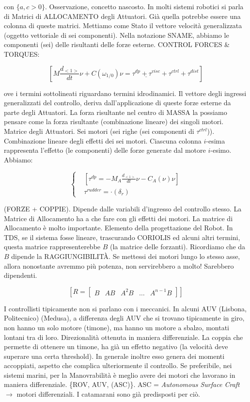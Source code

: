 con $\{a,c>0\}$. Osservazione, concetto nascosto. In molti sistemi robotici si parla di Matrici di ALLOCAMENTO degli Attuatori. Già quella potrebbe essere una colonna di queste matrici. Mettiamo come Stato il vettore velocità generalizzata (oggetto vettoriale di sei componenti). Nella notazione SNAME, abbiamo le componenti (sei) delle risultanti delle forze esterne. CONTROL FORCES \& TORQUES:

\[
	[M\frac{d_{<1>}}{dt}\nu + C(\omega_{1/0})\nu = \underline{\tau^{dp}+\tau^{visc}} + \tau^{ctrl}+\tau^{dist}]
\]

ove i termini sottolineati riguardano termini idrodinamici. Il vettore degli ingressi generalizzati del controllo, deriva dall'applicazione di queste forze esterne da parte degli Attuatori. La forza risultante nel centro di MASSA la possiamo pensare come la forza risultante (combinazione lineare) dei singoli motori. Matrice degli Attuatori. Sei motori (sei righe (sei componenti di $\tau^{ctrl}$)). Combinazione lineare degli effetti dei sei motori. Ciascuna colonna $i$-esima rappresenta l'effetto (le componenti) delle forze generate dal motore $i$-esimo. Abbiamo:

\[
	\left\{
	\begin{aligned}
	&[\tau^{dp} = -M_A\frac{d_{<1>}}{dt}\nu - C_A(\nu)\nu]\\
	&\tau^{rudder} = \mathord{\cdot}(\delta_r)
	\end{aligned}
	\right.
\]

(FORZE + COPPIE). Dipende dalle variabili d'ingresso del controllo stesso. La Matrice di Allocamento ha a che fare con gli effetti dei motori. La matrice di Allocamento è molto importante. Elemento della progettazione del Robot. In TDS, se il sistema fosse lineare, trascurando CORIOLIS ed alcuni altri termini, questa matrice rappresenterebbe $B$ (la matrice delle forzanti). Ricordiamo che da $B$ dipende la RAGGIUNGIBILIT\`A. Se mettessi dei motori lungo lo stesso asse, allora nonostante avremmo più potenza, non servirebbero a molto! Sarebbero dipendenti.

\[
	[R = \begin{bmatrix}B&AB&A^2B&\dots&A^{n-1}B\end{bmatrix}]
\]

I controllisti tipicamente non si parlano con i meccanici. In alcuni AUV (Lisbona, Politecnico) (Medusa), a differenza degli AUV che si trovano tipicamente in giro, non hanno un solo motore (timone), ma hanno un motore a sbalzo, montati lontani tra di loro. Direzionalità ottenuta in maniera differenziale. La coppia che permette di ottenere un timone, ha già un effetto negativo (la velocità deve superare una certa threshold). In generale inoltre esso genera dei momenti accoppiati, aspetto che complica ulteriormente il controllo. Se preferibile, nei sistemi marini, per la Manovrabilità è meglio avere dei motori che lavorano in maniera differenziale. \{ROV, AUV, (ASC)\}. ASC = \textit{Autonomous Surface Craft} $\rightarrow$ motori differenziali. I catamarani sono già predisposti per ciò.


